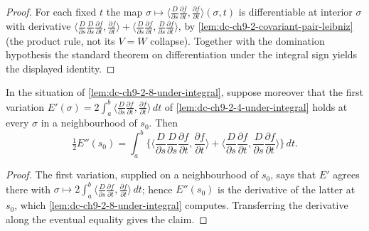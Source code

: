 \begin{proof}

  \sketch
  For each fixed $t$ the map
  $\sigma\mapsto\langle\frac{D}{\partial s}\frac{\partial f}{\partial t},\frac{\partial f}{\partial t}\rangle(\sigma,t)$
  is differentiable at interior $\sigma$ with derivative
  $\langle\frac{D}{\partial s}\frac{D}{\partial s}\frac{\partial f}{\partial t},\frac{\partial f}{\partial t}\rangle
  +\langle\frac{D}{\partial s}\frac{\partial f}{\partial t},\frac{D}{\partial s}\frac{\partial f}{\partial t}\rangle$,
  by \cref{lem:dc-ch9-2-covariant-pair-leibniz} (the product rule, not its $V=W$ collapse).
  Together with the domination hypothesis the standard theorem on differentiation under the
  integral sign yields the displayed identity.
\end{proof}
\begin{lemma}
  \label{lem:dc-ch9-2-8-energy-snd-deriv}


  In the situation of \cref{lem:dc-ch9-2-8-under-integral}, suppose moreover that the first
  variation $E'(\sigma)=2\int_a^b\langle\frac{D}{\partial s}\frac{\partial f}{\partial t},
  \frac{\partial f}{\partial t}\rangle\,dt$ of \cref{lem:dc-ch9-2-4-under-integral} holds at
  every $\sigma$ in a neighbourhood of $s_0$. Then
  $$
  \tfrac12 E''(s_0)
  = \int_a^b\Big\{\Big\langle\frac{D}{\partial s}\frac{D}{\partial s}\frac{\partial f}{\partial t},
    \frac{\partial f}{\partial t}\Big\rangle
    + \Big\langle\frac{D}{\partial s}\frac{\partial f}{\partial t},
      \frac{D}{\partial s}\frac{\partial f}{\partial t}\Big\rangle\Big\}\,dt .
  $$

\end{lemma}
\begin{proof}

  \sketch
  The first variation, supplied on a neighbourhood of $s_0$, says that $E'$ agrees there with
  $\sigma\mapsto 2\int_a^b\langle\frac{D}{\partial s}\frac{\partial f}{\partial t},\frac{\partial f}{\partial t}\rangle\,dt$;
  hence $E''(s_0)$ is the derivative of the latter at $s_0$, which
  \cref{lem:dc-ch9-2-8-under-integral} computes. Transferring the derivative along the
  eventual equality gives the claim.
\end{proof}
